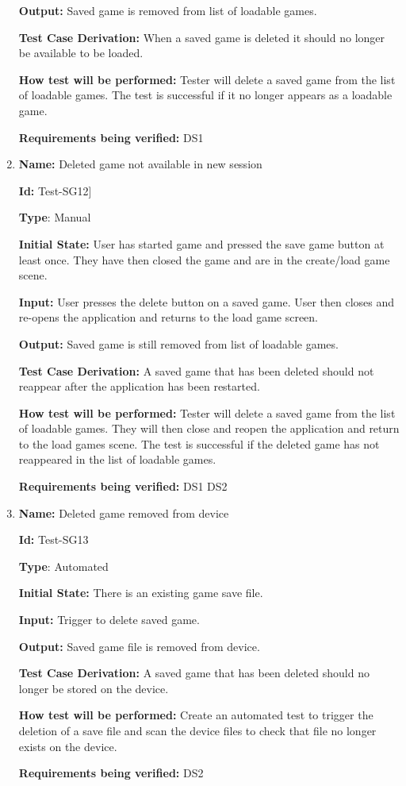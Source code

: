 \documentclass[12pt, titlepage]{article}
\begin{document}
\begin{enumerate}
\textbf{Output:} Saved game is removed from list of loadable games.

\textbf{Test Case Derivation:}
When a saved game is deleted it should no longer be available to be loaded.

\textbf{How test will be performed:}
Tester will delete a saved game from the list of loadable games. The test is successful if it no longer appears as a loadable game.

\textbf{Requirements being verified: } DS1

\item{\textbf{Name:} Deleted game not available in new session}

\textbf{Id:} Test-SG12]

\textbf{Type}: Manual

\textbf{Initial State:} User has started game and pressed the save game button at least once. They have then closed the game and are in the create/load game scene. 

\textbf{Input:} User presses the delete button on a saved game. User then closes and re-opens the application and returns to the load game screen.

\textbf{Output:} Saved game is still removed from list of loadable games.

\textbf{Test Case Derivation:}
A saved game that has been deleted should not reappear after the application has been restarted.

\textbf{How test will be performed:}
Tester will delete a saved game from the list of loadable games. They will then close and reopen the application and return to the load games scene. The test is successful if the deleted game has not reappeared in the list of loadable games.

\textbf{Requirements being verified: } DS1 DS2

\item{\textbf{Name:} Deleted game removed from device}

\textbf{Id:} Test-SG13

\textbf{Type}: Automated

\textbf{Initial State:} There is an existing game save file.

\textbf{Input:} Trigger to delete saved game.

\textbf{Output:} Saved game file is removed from device.

\textbf{Test Case Derivation:}
A saved game that has been deleted should no longer be stored on the device.

\textbf{How test will be performed:}
Create an automated test to trigger the deletion of a save file and scan the device files to check that file no longer exists on the device.

\textbf{Requirements being verified: } DS2

\end{enumerate}
\end{document}
